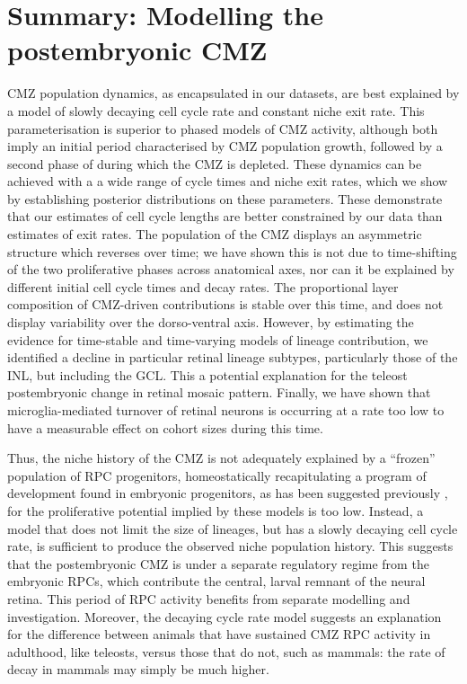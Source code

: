 \section{Summary: Modelling the postembryonic CMZ}
CMZ population dynamics, as encapsulated in our datasets, are best explained by a model of slowly decaying cell cycle rate and constant niche exit rate. This parameterisation is superior to phased models of CMZ activity, although both imply an initial period characterised by CMZ population growth, followed by a second phase of during which the CMZ is depleted. These dynamics can be achieved with a a wide range of cycle times and niche exit rates, which we show by establishing posterior distributions on these parameters. These demonstrate that our estimates of cell cycle lengths are better constrained by our data than estimates of exit rates. The population of the CMZ displays an asymmetric structure which reverses over time; we have shown this is not due to time-shifting of the two proliferative phases across anatomical axes, nor can it be explained by different initial cell cycle times and decay rates. The proportional layer composition of CMZ-driven contributions is stable over this time, and does not display variability over the dorso-ventral axis. However, by estimating the evidence for time-stable and time-varying models of lineage contribution, we identified a decline in particular retinal lineage subtypes, particularly those of the INL, but including the GCL. This a potential explanation for the teleost postembryonic change in retinal mosaic pattern. Finally, we have shown that microglia-mediated turnover of retinal neurons is occurring at a rate too low to have a measurable effect on cohort sizes during this time.

Thus, the niche history of the CMZ is not adequately explained by a ``frozen'' population of RPC progenitors, homeostatically recapitulating a program of development found in embryonic progenitors, as has been suggested previously \cite{Harris1998,Wan2016}, for the proliferative potential implied by these models is too low. Instead, a model that does not limit the size of lineages, but has a slowly decaying cell cycle rate, is sufficient to produce the observed niche population history. This suggests that the postembryonic CMZ is under a separate regulatory regime from the embryonic RPCs, which contribute the central, larval remnant of the neural retina. This period of RPC activity benefits from separate modelling and investigation. Moreover, the decaying cycle rate model suggests an explanation for the difference between animals that have sustained CMZ RPC activity in adulthood, like teleosts, versus those that do not, such as mammals: the rate of decay in mammals may simply be much higher.

